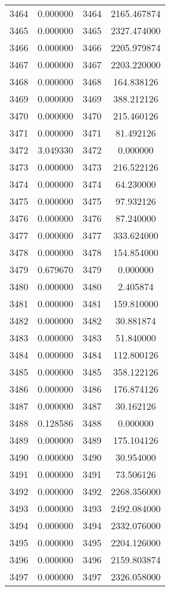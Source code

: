 \documentclass[12pt]{article}
\begin{document}
\begin{longtable}{@{}cccc@{}}
3464 & 0.000000 & 3464 & 2165.467874 \\
3465 & 0.000000 & 3465 & 2327.474000 \\
3466 & 0.000000 & 3466 & 2205.979874 \\
3467 & 0.000000 & 3467 & 2203.220000 \\
3468 & 0.000000 & 3468 & 164.838126 \\
3469 & 0.000000 & 3469 & 388.212126 \\
3470 & 0.000000 & 3470 & 215.460126 \\
3471 & 0.000000 & 3471 & 81.492126 \\
3472 & 3.049330 & 3472 & 0.000000 \\
3473 & 0.000000 & 3473 & 216.522126 \\
3474 & 0.000000 & 3474 & 64.230000 \\
3475 & 0.000000 & 3475 & 97.932126 \\
3476 & 0.000000 & 3476 & 87.240000 \\
3477 & 0.000000 & 3477 & 333.624000 \\
3478 & 0.000000 & 3478 & 154.854000 \\
3479 & 0.679670 & 3479 & 0.000000 \\
3480 & 0.000000 & 3480 & 2.405874 \\
3481 & 0.000000 & 3481 & 159.810000 \\
3482 & 0.000000 & 3482 & 30.881874 \\
3483 & 0.000000 & 3483 & 51.840000 \\
3484 & 0.000000 & 3484 & 112.800126 \\
3485 & 0.000000 & 3485 & 358.122126 \\
3486 & 0.000000 & 3486 & 176.874126 \\
3487 & 0.000000 & 3487 & 30.162126 \\
3488 & 0.128586 & 3488 & 0.000000 \\
3489 & 0.000000 & 3489 & 175.104126 \\
3490 & 0.000000 & 3490 & 30.954000 \\
3491 & 0.000000 & 3491 & 73.506126 \\
3492 & 0.000000 & 3492 & 2268.356000 \\
3493 & 0.000000 & 3493 & 2492.084000 \\
3494 & 0.000000 & 3494 & 2332.076000 \\
3495 & 0.000000 & 3495 & 2204.126000 \\
3496 & 0.000000 & 3496 & 2159.803874 \\
3497 & 0.000000 & 3497 & 2326.058000 \\

\end{longtable}
\end{document}
